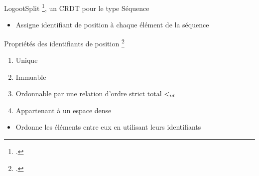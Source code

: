 
\begin{frame}{LogootSplit \footcite{2013-logootsplit}, un CRDT pour le type Séquence}
    \begin{itemize}
        \item Assigne \alert{identifiant de position} à chaque élément de la séquence
    \end{itemize}
    \pause
    \begin{block}{Propriétés des identifiants de position \footcite{2009-treedoc-preguica}}
        \begin{enumerate}
            \item Unique
            \item Immuable
            \item Ordonnable par une relation d'ordre strict total $<_{id}$
            \item Appartenant à un espace dense
        \end{enumerate}
    \end{block}
    \pause
    \begin{itemize}
        \item \alert{Ordonne les éléments} entre eux \alert{en utilisant} leurs \alert{identifiants}
    \end{itemize}
\end{frame}

